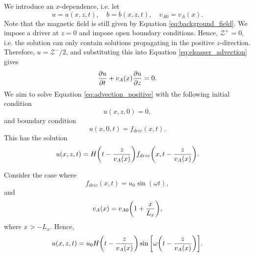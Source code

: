 We introduce an $x$-dependence, i.e. let
\[u = u(x,z,t),\quad b = b(x,z,t),\quad v_{A0} = v_A(x).\]
Note that the magnetic field is still given by Equation \eqref{eq:background_field}.
We impose a driver at $z=0$ and impose open boundary conditions. Hence, $\mathcal{Z}^+=0$, i.e. the solution can only contain solutions propagating in the positive $z$-direction. Therefore, $u=\mathcal{Z}^-/2$, and substituting this into Equation \eqref{eq:elsasser_advection} gives
\begin{equation}
    \label{eq:advection_positive}
    \pdv{u}{t}+v_A(x)\pdv{u}{z}=0.
\end{equation}
We aim to solve Equation \eqref{eq:advection_positive} with the following initial condition
\begin{equation}
    u(x,z,0) = 0,
\end{equation}
and boundary condition
\begin{equation}
    u(x,0,t) = f_{driv}(x,t).
\end{equation}
This has the solution
\begin{equation}
    u(x,z,t) = H\qty(t - \frac{z}{v_A(x)})f_{driv}\qty(x,t - \frac{z}{v_A(x)}).
\end{equation}

Consider the case where
\begin{equation}
    f_{driv}(x, t) = u_0\sin(\omega t),
\end{equation}
and
\begin{equation}
    v_A(x) = v_{A0}\qty(1+\frac{x}{L_x}),
\end{equation}
where $x > -L_x$.
Hence,
\begin{equation}
    u(x,z,t) = u_0H\qty(t - \frac{z}{v_A(x)})\sin\qty[\omega\qty(t - \frac{z}{v_A(x)})].
\end{equation}

